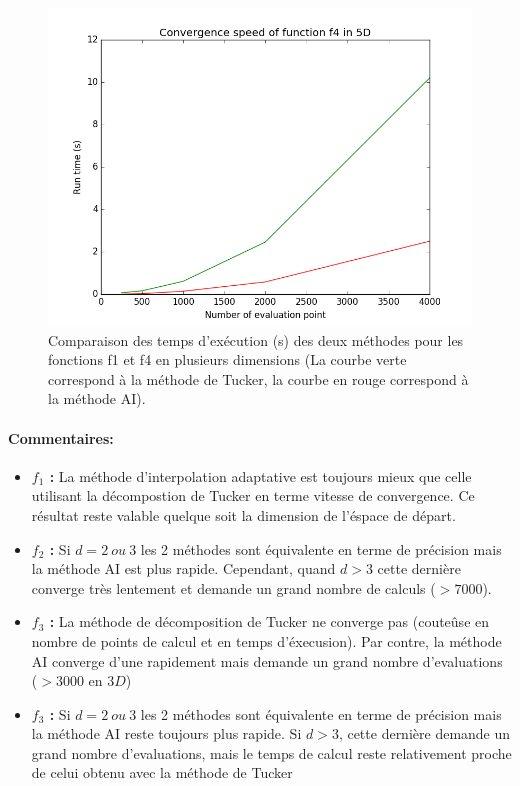 \begin{figure}[h]
\begin{minipage}[b]{0.32\linewidth}
				\centering \includegraphics[scale=0.3]{images/f4_5d_s.png}
		\end{minipage}
\caption{Comparaison des temps d'exécution (s) des deux méthodes pour les fonctions f1 et f4 en plusieurs dimensions (La courbe verte correspond à la méthode de Tucker, la courbe en rouge correspond à la méthode AI).}
\end{figure}
\newpage
\paragraph{Commentaires:}
\begin{itemize}
	\item \textbf{$f_1$ :} La méthode d'interpolation adaptative est toujours mieux que celle utilisant la décompostion de Tucker en terme vitesse de convergence. Ce résultat reste valable quelque soit la dimension de l'éspace de départ.

	\item \textbf{$f_2$ :} Si $d=2\ ou\ 3$ les 2 méthodes sont équivalente en terme de précision mais la méthode AI est plus rapide. Cependant, quand $d>3$ cette dernière converge très lentement et demande un grand nombre de calculs ($>7000$).

	\item \textbf{$f_3$ :} La méthode de décomposition de Tucker ne converge pas (couteûse en nombre de points de calcul et en temps d'éxecusion). Par contre, la méthode AI converge d'une rapidement mais demande un grand nombre d’evaluations ($>3000$ en $3D$)

	\item \textbf{$f_3$ :} Si $d=2\ ou\ 3$ les 2 méthodes sont équivalente en terme de précision mais la méthode AI reste toujours plus rapide. Si $d>3$, cette dernière demande un grand nombre d’evaluations, mais le temps de calcul reste relativement proche de celui obtenu avec la méthode de Tucker
\end{itemize}

